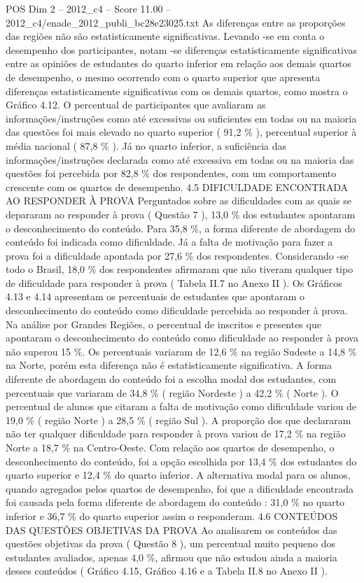 \begin{textsample}{POS Dim 2 – 2012\_c4 – Score 11.00 – 2012\_c4/enade\_2012\_publi\_bc28e23025.txt}
As diferenças entre as proporções das regiões não são estatisticamente significativas.
Levando -se em conta o desempenho dos participantes, notam -se diferenças estatisticamente significativas entre as opiniões de estudantes do quarto inferior em relação aos demais quartos de desempenho, o mesmo ocorrendo com o quarto superior que apresenta diferenças estatisticamente significativas com os demais quartos, como mostra o Gráfico 4.12.
O percentual de participantes que avaliaram as informações/instruções como até excessivas ou suficientes em todas ou na maioria das questões foi mais elevado no quarto superior ( 91,2 \% ), percentual superior à média nacional ( 87,8 \% ).
Já no quarto inferior, a suficiência das informações/instruções declarada como até excessiva em todas ou na maioria das questões foi percebida por 82,8 \% dos respondentes, com um comportamento crescente com os quartos de desempenho. 4.5 DIFICULDADE ENCONTRADA AO RESPONDER À PROVA Perguntados sobre as dificuldades com as quais se depararam ao responder à prova ( Questão 7 ), 13,0 \% dos estudantes apontaram o desconhecimento do conteúdo.
Para 35,8 \%, a forma diferente de abordagem do conteúdo foi indicada como dificuldade.
Já a falta de motivação para fazer a prova foi a dificuldade apontada por 27,6 \% dos respondentes.
Considerando -se todo o Brasil, 18,0 \% dos respondentes afirmaram que não tiveram qualquer tipo de dificuldade para responder à prova ( Tabela II.7 no Anexo II ).
Os Gráficos 4.13 e 4.14 apresentam os percentuais de estudantes que apontaram o desconhecimento do conteúdo como dificuldade percebida ao responder à prova.
Na análise por Grandes Regiões, o percentual de inscritos e presentes que apontaram o desconhecimento do conteúdo como dificuldade ao responder à prova não superou 15 \%.
Os percentuais variaram de 12,6 \% na região Sudeste a 14,8 \% na Norte, porém esta diferença não é estatisticamente significativa.
A forma diferente de abordagem do conteúdo foi a escolha modal dos estudantes, com percentuais que variaram de 34,8 \% ( região Nordeste ) a 42,2 \% ( Norte ).
O percentual de alunos que citaram a falta de motivação como dificuldade variou de 19,0 \% ( região Norte ) a 28,5 \% ( região Sul ).
A proporção dos que declararam não ter qualquer dificuldade para responder à prova variou de 17,2 \% na região Norte a 18,7 \% na Centro-Oeste.
Com relação aos quartos de desempenho, o desconhecimento do conteúdo, foi a opção escolhida por 13,4 \% dos estudantes do quarto superior e 12,4 \% do quarto inferior.
A alternativa modal para os alunos, quando agregados pelos quartos de desempenho, foi que a dificuldade encontrada foi causada pela forma diferente de abordagem do conteúdo : 31,0 \% no quarto inferior e 36,7 \% do quarto superior assim o responderam. 4.6 CONTEÚDOS DAS QUESTÕES OBJETIVAS DA PROVA Ao analisarem os conteúdos das questões objetivas da prova ( Questão 8 ), um percentual muito pequeno dos estudantes avaliados, apenas 4,0 \%, afirmou que não estudou ainda a maioria desses conteúdos ( Gráfico 4.15, Gráfico 4.16 e a Tabela II.8 no Anexo II ).

\end{textsample}

